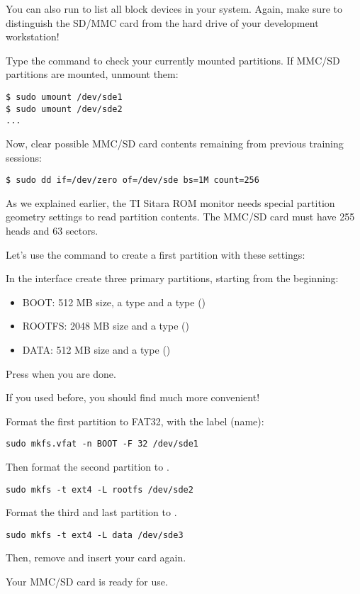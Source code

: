 You can also run  to list all block devices
in your system. Again, make sure to distinguish the SD/MMC card from the
hard drive of your development workstation!

\clearpage
Type the  command to check your currently mounted
partitions. If MMC/SD partitions are mounted, unmount them:

\begin{verbatim}
$ sudo umount /dev/sde1
$ sudo umount /dev/sde2
...
\end{verbatim}

Now, clear possible MMC/SD card contents remaining from previous training 
sessions:

\begin{verbatim}
$ sudo dd if=/dev/zero of=/dev/sde bs=1M count=256
\end{verbatim}

As we explained earlier, the TI Sitara ROM monitor needs special partition geometry settings
to read partition contents. The MMC/SD card must have 255 heads and 63 sectors.

Let's use the  command to create a first partition with these settings:


In the  interface create three primary partitions, starting from the beginning:

\begin{itemize}
\item BOOT: 512 MB size, a  type and a  type ()
\item ROOTFS:  2048 MB size and a  type ()
\item DATA: 512 MB size and
a  type ()
\end{itemize}

Press  when you are done.

If you used  before, you should find  much more convenient!

Format the first partition to FAT32, with the  label (name):

\begin{verbatim}
sudo mkfs.vfat -n BOOT -F 32 /dev/sde1
\end{verbatim}

Then format the second partition to .

\begin{verbatim}
sudo mkfs -t ext4 -L rootfs /dev/sde2
\end{verbatim}

Format the third and last partition to .

\begin{verbatim}
sudo mkfs -t ext4 -L data /dev/sde3
\end{verbatim}

Then, remove and insert your card again.

Your MMC/SD card is ready for use.


